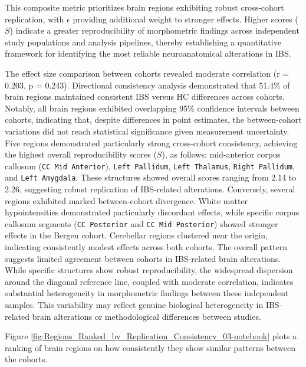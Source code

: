 \documentclass[diagnostics,article,accept,pdftex,moreauthors]{Definitions/mdpi}
\begin{document}
This composite metric prioritizes brain regions exhibiting robust cross-cohort replication, with $\epsilon$ providing additional weight to stronger effects. Higher scores ($S$) indicate a greater reproducibility of morphometric findings across independent study populations and analysis pipelines, thereby establishing a quantitative framework for identifying the most reliable neuroanatomical alterations in IBS.




The effect size comparison between cohorts revealed moderate correlation (r = 0.203, p = 0.243). Directional consistency analysis demonstrated that 51.4\% of brain regions maintained consistent IBS versus HC differences across cohorts. Notably, all brain regions exhibited overlapping 95\% confidence intervals between cohorts, indicating that, despite differences in point estimates, the between-cohort variations did not reach statistical significance given measurement uncertainty. Five regions demonstrated particularly strong cross-cohort consistency, achieving the highest overall reproducibility scores ($S$), as follows: mid-anterior corpus callosum (\texttt{CC Mid Anterior}), \texttt{Left Pallidum}, \texttt{Left Thalamus}, \texttt{Right Pallidum}, and \texttt{Left Amygdala}. These structures showed overall scores ranging from 2.14 to 2.26, suggesting robust replication of IBS-related alterations. Conversely, several regions exhibited marked between-cohort divergence. White matter hypointensities demonstrated particularly discordant effects, while specific corpus callosum segments (\texttt{CC Posterior} and \texttt{CC Mid Posterior}) showed stronger effects in the Bergen cohort. Cerebellar regions clustered near the origin, indicating consistently modest effects across both cohorts. The overall pattern suggests limited agreement between cohorts in IBS-related brain alterations. While specific structures show robust reproducibility, the widespread dispersion around the diagonal reference line, coupled with moderate correlation, indicates substantial heterogeneity in morphometric findings between these independent samples. This variability may reflect genuine biological heterogeneity in IBS-related brain alterations or methodological differences between studies.

Figure \ref{fig:Regions_Ranked_by_Replication_Consistency_03-notebook} plots a ranking of brain regions on how consistently they show similar patterns between the cohorts.
\end{document}

